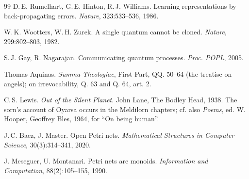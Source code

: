 \begin{thebibliography}{99}
D.\,E. Rumelhart, G.\,E. Hinton, R.\,J. Williams. Learning
representations by back-propagating errors. \emph{Nature}, 323:533--536, 1986.

W.\,K. Wootters, W.\,H. Zurek. A single quantum cannot be
cloned. \emph{Nature}, 299:802--803, 1982.

S.\,J. Gay, R. Nagarajan. Communicating quantum processes.
\emph{Proc. POPL}, 2005.

Thomas Aquinas. \emph{Summa Theologiae}, First Part, QQ.
50--64 (the treatise on angels); on irrevocability, Q. 63 and Q. 64, art. 2.

C.\,S. Lewis. \emph{Out of the Silent Planet}. John Lane,
The Bodley Head, 1938. The sorn's account of Oyarsa occurs in the Meldilorn
chapters; cf. also \emph{Poems}, ed. W. Hooper, Geoffrey Bles, 1964, for ``On
being human''.

J.\,C. Baez, J. Master. Open Petri nets. \emph{Mathematical
Structures in Computer Science}, 30(3):314--341, 2020.

J. Meseguer, U. Montanari. Petri nets are monoids.
\emph{Information and Computation}, 88(2):105--155, 1990.

\end{thebibliography}

